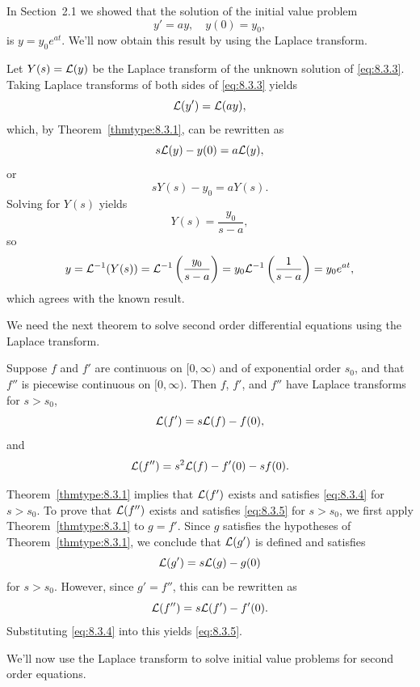 In Section~2.1 we showed that the solution of the initial value problem
\begin{equation}
  \label{eq:8.3.3}y'=ay,\quad y(0)=y_{0},
\end{equation}
is $y=y_{0}e^{at}$. We'll now obtain this result by using the Laplace transform.

Let $Y(s)={\cal L}(y)$ be the Laplace transform of the unknown solution of \eqref{eq:8.3.3}. Taking
Laplace transforms of both sides of \eqref{eq:8.3.3} yields
\[
  {\cal L}(y')={\cal L}(ay),
\]
which, by Theorem~\ref{thmtype:8.3.1}, can be rewritten as
\[
  s{\cal L}(y)-y(0)=a{\cal L}(y),
\]
or
\[
  sY(s)-y_{0}=aY(s).
\]
Solving for $Y(s)$ yields
\[
  Y(s)=\frac{y_{0}}{s-a},
\]
so
\[
  y={\cal L}^{-1}(Y(s))={\cal L}^{-1}\left(\frac{y_{0}}{s-a}\right)=y_{0}{\cal L}^{-1}\left(\frac{1}{s-a}\right)=y_{0}e^{at},
\]
which agrees with the known result.

We need the next theorem to solve second order differential equations using the Laplace transform.

\begin{theorem}
  \color{blue}
  \label{thmtype:8.3.2} Suppose $f$ and $f'$ are continuous on $[0,\infty)$ and of exponential order
  $s_{0}$, and that $f''$ is piecewise continuous on $[0,\infty)$. Then $f$, $f'$, and $f''$ have
  Laplace transforms for $s >s_{0}$,
  \begin{equation}
    \label{eq:8.3.4}{\cal L}(f')=s{\cal L}(f)-f(0),
  \end{equation}
  and
  \begin{equation}
    \label{eq:8.3.5}{\cal L}(f'')=s^{2}{\cal L}(f)-f'(0)-sf(0).
  \end{equation}
\end{theorem}

\proof Theorem~\ref{thmtype:8.3.1} implies that ${\cal L}(f')$ exists and satisfies \eqref{eq:8.3.4}
for $s>s_{0}$. To prove that ${\cal L}(f'')$ exists and satisfies \eqref{eq:8.3.5} for $s>s_{0}$, we
first apply Theorem~\ref{thmtype:8.3.1} to $g=f'$. Since $g$ satisfies the hypotheses of
Theorem~\ref{thmtype:8.3.1}, we conclude that ${\cal L}(g')$ is defined and satisfies
\[
  {\cal L}(g')=s{\cal L}(g)-g(0)
\]
for $s>s_{0}$. However, since $g'=f''$, this can be rewritten as
\[
  {\cal L}(f'')=s{\cal L}(f')-f'(0).
\]
Substituting \eqref{eq:8.3.4} into this yields \eqref{eq:8.3.5}.


\noindent
We'll now use the Laplace transform to solve initial value problems for second order equations.

